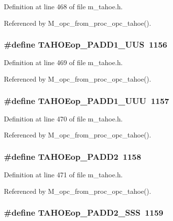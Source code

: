 Definition at line 468 of file m\_\-tahoe.h.

Referenced by M\_\-opc\_\-from\_\-proc\_\-opc\_\-tahoe().
\subsubsection{\setlength{\rightskip}{0pt plus 5cm}\#define TAHOEop\_\-PADD1\_\-UUS~1156}\label{m__tahoe_8h_0ec898c1c92807f778925b7efd225268}




Definition at line 469 of file m\_\-tahoe.h.

Referenced by M\_\-opc\_\-from\_\-proc\_\-opc\_\-tahoe().
\subsubsection{\setlength{\rightskip}{0pt plus 5cm}\#define TAHOEop\_\-PADD1\_\-UUU~1157}\label{m__tahoe_8h_1f151fc6db3cf0f52fa65d624611e90b}




Definition at line 470 of file m\_\-tahoe.h.

Referenced by M\_\-opc\_\-from\_\-proc\_\-opc\_\-tahoe().
\subsubsection{\setlength{\rightskip}{0pt plus 5cm}\#define TAHOEop\_\-PADD2~1158}\label{m__tahoe_8h_375e67d1f513aa610c8b4c9848c106d1}




Definition at line 471 of file m\_\-tahoe.h.

Referenced by M\_\-opc\_\-from\_\-proc\_\-opc\_\-tahoe().
\subsubsection{\setlength{\rightskip}{0pt plus 5cm}\#define TAHOEop\_\-PADD2\_\-SSS~1159}\label{m__tahoe_8h_a08765f6a089aa13f4217fb39060bb41}




